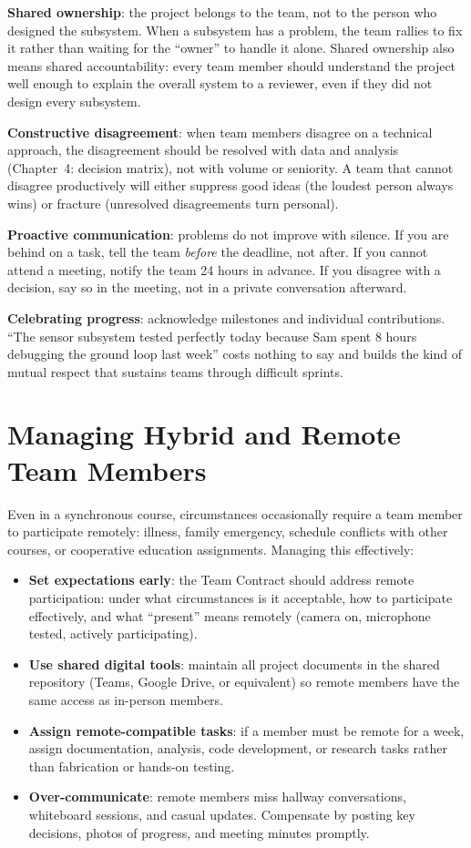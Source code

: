 \textbf{Shared ownership}: the project belongs to the team, not to the person who designed the subsystem. When a subsystem has a problem, the team rallies to fix it rather than waiting for the ``owner'' to handle it alone. Shared ownership also means shared accountability: every team member should understand the project well enough to explain the overall system to a reviewer, even if they did not design every subsystem.

\textbf{Constructive disagreement}: when team members disagree on a technical approach, the disagreement should be resolved with data and analysis (Chapter~4: decision matrix), not with volume or seniority. A team that cannot disagree productively will either suppress good ideas (the loudest person always wins) or fracture (unresolved disagreements turn personal).

\textbf{Proactive communication}: problems do not improve with silence. If you are behind on a task, tell the team \emph{before} the deadline, not after. If you cannot attend a meeting, notify the team 24 hours in advance. If you disagree with a decision, say so in the meeting, not in a private conversation afterward.

\textbf{Celebrating progress}: acknowledge milestones and individual contributions. ``The sensor subsystem tested perfectly today because Sam spent 8 hours debugging the ground loop last week'' costs nothing to say and builds the kind of mutual respect that sustains teams through difficult sprints.

\section{Managing Hybrid and Remote Team Members}
Even in a synchronous course, circumstances occasionally require a team member to participate remotely: illness, family emergency, schedule conflicts with other courses, or cooperative education assignments. Managing this effectively:

\begin{itemize}[nosep,leftmargin=1.5em]
\item \textbf{Set expectations early}: the Team Contract should address remote participation: under what circumstances is it acceptable, how to participate effectively, and what ``present'' means remotely (camera on, microphone tested, actively participating).
\item \textbf{Use shared digital tools}: maintain all project documents in the shared repository (Teams, Google Drive, or equivalent) so remote members have the same access as in-person members.
\item \textbf{Assign remote-compatible tasks}: if a member must be remote for a week, assign documentation, analysis, code development, or research tasks rather than fabrication or hands-on testing.
\item \textbf{Over-communicate}: remote members miss hallway conversations, whiteboard sessions, and casual updates. Compensate by posting key decisions, photos of progress, and meeting minutes promptly.
\end{itemize}

